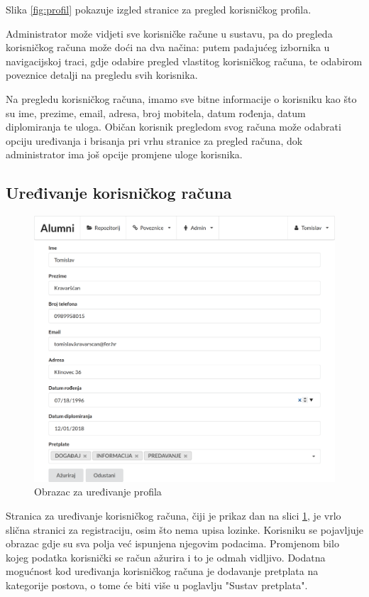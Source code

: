 \documentclass[zavrsni, numeric]{fer}
\begin{document}
Slika \ref{fig:profil} pokazuje izgled stranice za pregled korisničkog profila.

Administrator može vidjeti sve korisničke račune u sustavu, pa do pregleda korisničkog računa može doći na dva načina: putem padajućeg izbornika u navigacijskoj traci, gdje odabire pregled vlastitog korisničkog računa, te odabirom poveznice detalji na pregledu svih korisnika.

Na pregledu korisničkog računa, imamo sve bitne informacije o korisniku kao što su ime, prezime, email, adresa, broj mobitela, datum rođenja, datum diplomiranja te uloga. Običan korisnik pregledom svog računa može odabrati opciju uređivanja i brisanja pri vrhu stranice za pregled računa, dok administrator ima još opcije promjene uloge korisnika.

\subsection{Uređivanje korisničkog računa}

\begin{figure}[H]
	\centering
	\includegraphics[width=13cm]{slike/uredi-profil.png}
	\caption{Obrazac za uređivanje profila}
	\label{fig:uredi-profil}
\end{figure}

Stranica za uređivanje korisničkog računa, čiji je prikaz dan na slici \ref{fig:uredi-profil}, je vrlo slična stranici za registraciju, osim što nema upisa lozinke. Korisniku se pojavljuje obrazac gdje su sva polja već ispunjena njegovim podacima. Promjenom bilo kojeg podatka korisnički se račun ažurira i to je odmah vidljivo. Dodatna mogućnost kod uređivanja korisničkog računa je dodavanje pretplata na kategorije postova, o tome će biti više u poglavlju "Sustav pretplata".
\end{document}
